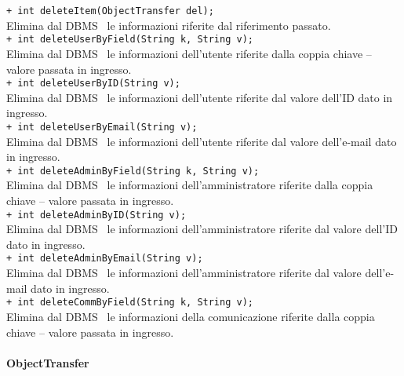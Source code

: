 {\begin{sloppypar}
{{{{\begin{itemize}
{				\texttt{+ int deleteItem(ObjectTransfer del);} \\
				Elimina dal DBMS\g~ le informazioni riferite dal riferimento passato.\\
				
				\texttt{+ int deleteUserByField(String k, String v);} \\
				Elimina dal DBMS\g~ le informazioni dell'utente riferite dalla coppia chiave – valore passata in ingresso.\\
				
				\texttt{+ int deleteUserByID(String v);} \\
				Elimina dal DBMS\g~ le informazioni dell'utente riferite dal valore dell'ID dato in ingresso.\\
				
				\texttt{+ int deleteUserByEmail(String v);} \\
				Elimina dal DBMS\g~ le informazioni dell'utente riferite dal valore dell'e-mail dato in ingresso.\\
				
				\texttt{+ int deleteAdminByField(String k, String v);} \\
				Elimina dal DBMS\g~ le informazioni dell'amministratore riferite dalla coppia chiave – valore passata in ingresso.\\
				
				\texttt{+ int deleteAdminByID(String v);} \\
				Elimina dal DBMS\g~ le informazioni dell'amministratore riferite dal valore dell'ID dato in ingresso.\\
				
				\texttt{+ int deleteAdminByEmail(String v);} \\
				Elimina dal DBMS\g~ le informazioni dell'amministratore riferite dal valore dell'e-mail dato in ingresso.\\
								
				\texttt{+ int deleteCommByField(String k, String v);} \\
				Elimina dal DBMS\g~ le informazioni della comunicazione riferite dalla coppia chiave – valore passata in ingresso.\\
				}
			\end{itemize}
			}%


		\paragraph{ObjectTransfer}\label{par:ObjectTransfer}{
			\begin{itemize}
			

\end{itemize}}}}}
\end{sloppypar}}

